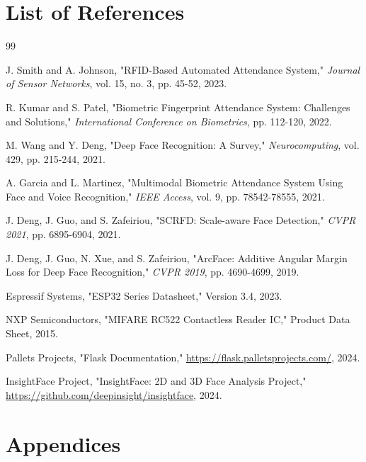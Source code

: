 \documentclass[12pt,a4paper]{article}
\begin{document}
\pagebreak

\section{List of References}

\begin{thebibliography}{99}

	J. Smith and A. Johnson, "RFID-Based Automated Attendance System," \textit{Journal of Sensor Networks}, vol. 15, no. 3, pp. 45-52, 2023.

	R. Kumar and S. Patel, "Biometric Fingerprint Attendance System: Challenges and Solutions," \textit{International Conference on Biometrics}, pp. 112-120, 2022.

	M. Wang and Y. Deng, "Deep Face Recognition: A Survey," \textit{Neurocomputing}, vol. 429, pp. 215-244, 2021.

	A. Garcia and L. Martinez, "Multimodal Biometric Attendance System Using Face and Voice Recognition," \textit{IEEE Access}, vol. 9, pp. 78542-78555, 2021.

	J. Deng, J. Guo, and S. Zafeiriou, "SCRFD: Scale-aware Face Detection," \textit{CVPR 2021}, pp. 6895-6904, 2021.

	J. Deng, J. Guo, N. Xue, and S. Zafeiriou, "ArcFace: Additive Angular Margin Loss for Deep Face Recognition," \textit{CVPR 2019}, pp. 4690-4699, 2019.

	Espressif Systems, "ESP32 Series Datasheet," Version 3.4, 2023.

	NXP Semiconductors, "MIFARE RC522 Contactless Reader IC," Product Data Sheet, 2015.

	Pallets Projects, "Flask Documentation," \url{https://flask.palletsprojects.com/}, 2024.

	InsightFace Project, "InsightFace: 2D and 3D Face Analysis Project," \url{https://github.com/deepinsight/insightface}, 2024.

\end{thebibliography}

\pagebreak

\section{Appendices}
\end{document}
